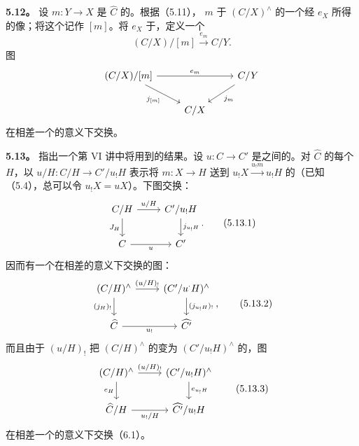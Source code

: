\textbf{5.12。} 设 $m:Y\to X$ 是 $\widehat C$ 的。根据（5.11）， $m$ 于 $(C/X)^{\wedge}$ 的一个经 $e_X$ 所得的像；将这个记作 $[m]$。将 $e_X$ 于，定义一个
\[(C/X)/[m]\xrightarrow{e_m}C/Y.\]
图
\[\begin{tikzcd}(C/X)/[m]\arrow[rr,"e_m"]\arrow[dr,"{j_{[m]}}"']&&C/Y\arrow[dl,"j_m"]\\&C/X&\end{tikzcd}\]
在相差一个的意义下交换。

\textbf{5.13。} 指出一个第 VI 讲中将用到的结果。设 $u:C\to C'$ 是之间的。对 $\widehat C$ 的每个 $H$，以 $u/H:C/H\to C'/u_!H$ 表示将 $m:X\to H$ 送到 $u_!X\xrightarrow{u_!m}u_!H$ 的（已知（5.4），总可以令 $u_!X=uX$）。下图交换：
\[\begin{tikzcd}C/H\arrow[r,"u/H"]\arrow[d,"J_H"']&C'/u_!H\arrow[d,"j_{u_!H}"]\\C\arrow[r,"u"']&C'\end{tikzcd}.\tag{5.13.1}\]
因而有一个在相差的意义下交换的图：
\[\begin{tikzcd}(C/H)^{\wedge}\arrow[r,"(u/H)_!"]\arrow[d,"(j_H)_!"']&(C'/u^{\cdot}H)^{\wedge}\arrow[d,"(j_{u_!H})_!"]\\\widehat C\arrow[r,"u_!"']&\widehat{C'}\end{tikzcd},\tag{5.13.2}\]
而且由于 $(u/H)_!$ 把 $(C/H)^{\wedge}$ 的变为 $(C'/u_!H)^{\wedge}$ 的，图
\[\begin{tikzcd}(C/H)^{\wedge}\arrow[r,"(u/H)_!"]\arrow[d,"e_H"']&(C'/u_!H)^{\wedge}\arrow[d,"e_{u_!H}"]\\\widehat C/H\arrow[r,"u_!/H"']&\widehat{C'}/u_!H\end{tikzcd}\tag{5.13.3}\]
在相差一个的意义下交换（6.1）。
